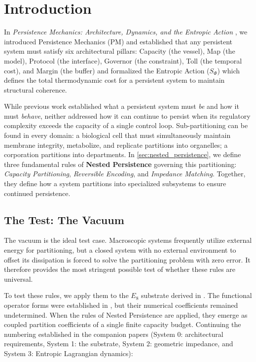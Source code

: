 \section{Introduction}
In \textit{Persistence Mechanics: Architecture, Dynamics, and the Entropic Action} \cite{meyer_persistence_2026}, we introduced Persistence Mechanics (PM) and established that any persistent system must satisfy six architectural pillars: Capacity (the vessel), Map (the model), Protocol (the interface), Governor (the constraint), Toll (the temporal cost), and Margin (the buffer) and formalized the Entropic Action ($S_\Phi$) which defines the total thermodynamic cost for a persistent system to maintain structural coherence.

While previous work established what a persistent system must \textit{be} and how it must \textit{behave}, neither addressed how it can continue to persist when its regulatory complexity exceeds the capacity of a single control loop. Sub-partitioning can be found in every domain: a biological cell that must simultaneously maintain membrane integrity, metabolize, and replicate partitions into organelles; a corporation partitions into departments. In \cref{sec:nested_persistence}, we define three fundamental rules of \textbf{Nested Persistence} governing this partitioning: \textit{Capacity Partitioning}, \textit{Reversible Encoding}, and \textit{Impedance Matching}. Together, they define how a system partitions into specialized subsystems to ensure continued persistence.

\subsection{The Test: The Vacuum}

The vacuum is the ideal test case. Macroscopic systems frequently utilize external energy for partitioning, but a closed system with no external environment to offset its dissipation is forced to solve the partitioning problem with zero error. It therefore provides the most stringent possible test of whether these rules are universal.

To test these rules, we apply them to the $E_8$ substrate derived in \cite{meyer_informational_2026}. The functional operator forms were established in \cite{meyer_ieaction_2026}, but their numerical coefficients remained undetermined. When the rules of Nested Persistence are applied, they emerge as coupled partition coefficients of a single finite capacity budget. Continuing the numbering established in the companion papers (System 0: architectural requirements, System 1: the substrate, System 2: geometric impedance, and System 3: Entropic Lagrangian dynamics):

